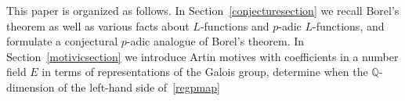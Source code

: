 \documentclass{amsart}
\begin{document}
This paper is organized as follows.  In Section~\ref{conjecturesection} we recall Borel's theorem as
well as various facts about {$L$-functions{\futurelet{}}} and {$p$-adic{\futurelet{}}} {$L$-functions{\futurelet{}}}, and formulate a conjectural {$p$-adic{\futurelet{}}} analogue of
Borel's theorem.
In Section~\ref{motivicsection} we introduce Artin motives with coefficients in a number field $ E $
in terms of representations of the Galois group,
determine when the $ {\mathbb Q} $-dimension of the left-hand side of~\eqref{regpmap}
\end{document}
